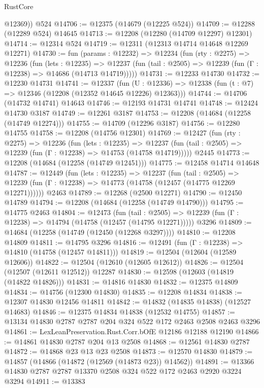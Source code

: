 \begin{lexlean}{RustCore}
\begin{coremodule}
        @12369))
    @524
@14706 := @12375 (@14679 (@12225 @524))
@14709 := @12288 (@12289 @524) @14645
@14713 := @12208 (@12280 (@14709 @12297) @12301)
@14714 := @12314 @524
@14719 := @12311 (@12313 @14714 @14648 @12269 @12271)
@14730 := fun (params : @12232) =>
  @12234
    (fun (rty : @2275) =>
    @12236
      (fun (lets : @12235) =>
      @12237 (fun (tail : @2505) => @12239 (fun (Γ : @12238) => @14686 (@14713 @14719)))))
@14731 := @12233 @14730
@14732 := @12230 @14731
@14741 := @12337
    (fun (U : @12336) => @12338 (fun (t : @7) => @12346 (@12208 (@12352 @14645 @12226) @12363)))
@14744 := @14706 (@14732 @14741) @14643
@14746 := @12193 @14731 @14741
@14748 := @12424 @14730 @3187
@14749 := @12261 @3187
@14753 := @12208 (@14684 (@12258 (@14749 @12274)))
@14755 := @14709 (@12296 @3187)
@14756 := @12280 @14755
@14758 := @12208 (@14756 @12301)
@14769 := @12427
    (fun (rty : @2275) =>
    @12236
      (fun (lets : @12235) =>
      @12237 (fun (tail : @2505) => @12239 (fun (Γ : @12238) => @14753 (@14758 @14719)))))
    @2445
@14773 := @12208 (@14684 (@12258 (@14749 @12451)))
@14775 := @12458 @14714 @14648
@14787 := @12449
    (fun (lets : @12235) =>
    @12237
      (fun (tail : @2505) =>
      @12239 (fun (Γ : @12238) => @14773 (@14758 (@12457 (@14775 @12269 @12271))))))
    @2463
@14789 := @12268 (@2500 @12271)
@14790 := @12450 @14789
@14794 := @12208 (@14684 (@12258 (@14749 @14790)))
@14795 := @14775 @2463
@14804 := @12473
    (fun (tail : @2505) => @12239 (fun (Γ : @12238) => @14794 (@14758 (@12457 (@14795 @12271)))))
    @3296
@14809 := @14684 (@12258 (@14749 (@12450 (@12268 @3297))))
@14810 := @12208 @14809
@14811 := @14795 @3296
@14816 := @12491 (fun (Γ : @12238) => @14810 (@14758 (@12457 @14811)))
@14819 := @12504 (@12604 (@12589 @12606))
@14822 := @12504 (@12610 (@12605 @12612))
@14826 := @12504 (@12507 (@12611 @12512)) @12287
@14830 := @12598 (@12603 (@14819 (@14822 @14826)))
@14831 := @14816 @14830
@14832 := @12375 @14809
@14834 := @14756 (@12300 @14830)
@14835 := @12208 @14834
@14838 := @12307 @14830 @12456 @14811
@14842 := @14832 (@14835 @14838) (@12527 @14683)
@14846 := @12375 @14834 @14838 (@12532 @14755)
@14857 := @13134 @14830 @2787 @2787 @204 @324 @522 @172 @2463 @2508 @2463 @3296
@14861 := LexLeanPreservation.Rust.Corr.bOfE @12186 @12188 @12190
@14866 := @14861 @14830 @2787 @204 @13 @2508
@14868 := @12561 @14830 @2787
@14872 := @14868 @23 @13 @23 @2508
@14873 := @12570 @14830
@14879 := @14857 (@14866 (@14872 (@12569 (@14873 @23)) @14562))
@14891 := @13366 @14830 @2787 @2787 @13370 @2508 @324 @522 @172 @2463 @2920 @3224 @3294
@14911 := @13383

\end{coremodule}
\end{lexlean}
